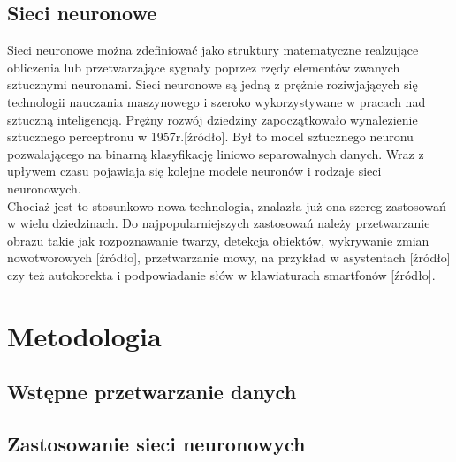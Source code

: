 \documentclass[12pt, a4paper, oneside]{article}
\begin{document}
	
	\subsection{Sieci neuronowe}
	Sieci neuronowe można zdefiniować jako struktury matematyczne realzujące obliczenia lub przetwarzające sygnały poprzez rzędy elementów zwanych sztucznymi neuronami. \cite{Sieci}
	Sieci neuronowe są jedną z prężnie roziwjających się technologii nauczania maszynowego i szeroko wykorzystywane w pracach nad sztuczną inteligencją.
	Prężny rozwój dziedziny zapoczątkowało wynalezienie sztucznego perceptronu w 1957r.[źródło]. Był to model sztucznego neuronu pozwalającego na binarną klasyfikację liniowo separowalnych danych. Wraz z upływem czasu pojawiaja się kolejne modele neuronów i rodzaje sieci neuronowych. 
	\\
	Chociaż jest to stosunkowo nowa technologia, znalazła już ona szereg zastosowań w wielu dziedzinach. Do najpopularniejszych zastosowań należy przetwarzanie obrazu takie jak rozpoznawanie twarzy, detekcja obiektów, wykrywanie zmian nowotworowych [źródło], przetwarzanie mowy, na przykład w asystentach [źródło] czy też autokorekta i podpowiadanie słów w klawiaturach smartfonów [źródło].
	
	
	
	\section{Metodologia}
	
	\subsection{Wstępne przetwarzanie danych}
	
	\subsection{Zastosowanie sieci neuronowych}
	
\end{document}

